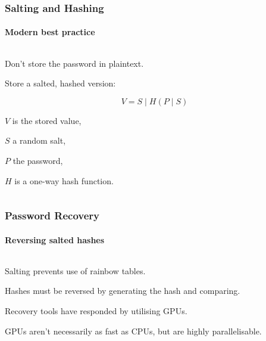 \documentclass[handout, notes=hide]{beamer}
\def\concat{\mathbin{|}}
\begin{document}

\begin{frame}
\frametitle{Salting and Hashing}
\framesubtitle{Modern best practice}
\setlength{\parskip}{0.5em}

\begin{columns}[T]
\begin{column}[T]{1.0\textwidth}
\setlength{\parskip}{0.5em}

Don't store the password in plaintext.

Store a salted, hashed version:

$$
V = S \concat H(P \concat S)
$$

$V$ is the stored value,

$S$ a random salt,

$P$ the password,

$H$ is a one-way hash function.

\end{column}
\end{columns}


\end{frame}


\begin{frame}
\frametitle{Password Recovery}
\framesubtitle{Reversing salted hashes}
\setlength{\parskip}{0.5em}

\begin{columns}[T]
\begin{column}[T]{1.0\textwidth}
\setlength{\parskip}{0.5em}
Salting prevents use of rainbow tables.

Hashes must be reversed by generating the hash and comparing.

Recovery tools have responded by utilising GPUs.

GPUs aren't necessarily as fast as CPUs, but are highly parallelisable.

\end{column}
\end{columns}


\end{frame}
\end{document}
